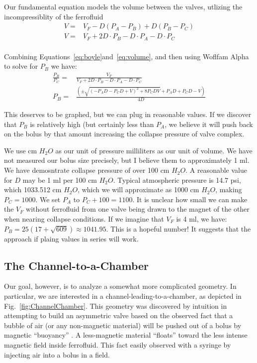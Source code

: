 \documentclass{asme2ej}
\begin{document}
Our fundamental equation models the volume between the
valves, utlizing the incompressiblity of the ferrofluid
\begin{align}
  V = & V_F - D(P_A - P_B) + D(P_B - P_C) \\
  V = & V_F + 2D\cdot P_B - D\cdot P_A - D\cdot P_C \\
    \label{eq:volume}
\end{align}

Combining Equations~\ref{eq:boyle}and~\ref{eq:volume}, and then
using Woflfam Alpha to solve for $P_B$ we have:
\begin{align}
  \frac{P_B}{P_C} = & \frac{V_F}{V_F + 2D\cdot P_B - D\cdot P_A - D\cdot P_C} \\
  P_B = & \frac{ (\pm \sqrt{(-P_A D - P_C D + V)^2 + 8 P_C D V} + P_A D + P_C D - V)}{4 D}
\end{align}

This deserves to be graphed, but we can plug in reasonable values.
If we discover that $P_B$ is relatively high (but certainly less than
$P_A$, we believe it will push back on the bolus by that amount increasing
the collapse pressure of valve complex.

We use cm $H_2O$ as our unit of pressure milliliters as our unit of volume.
We have not measured our bolus size precisely, but I believe them to approximately 1 ml. We have demosntrate collapse pressure of over 100 cm $H_2O$.
A reasonable value for $D$ may be 1 ml per 100 cm $H_2O$.
Typical atmospheric pressure is 14.7 psi, which 1033.512 cm $H_2O$, which
we will approximate as 1000 cm $H_2O$, making $P_C = 1000$.
We set $P_A$ to $P_C + 100 = 1100$.
It is unclear how small we can make the $V_F$ without ferrofluid
from one valve being drawn to the magnet of the other when nearing collapse
conditions. If we imagine that $V_F$ is 4 ml, we have:
$P_B  =  25 (17 + \sqrt{609})\approx 1041.95$. This is a hopeful number!
It suggests that the approach if plaing values in series will work.



\subsection{The Channel-to-a-Chamber}

Our goal, however, is to analyze a somewhat more complicated geometry.
In particular, we are interested in a channel-leading-to-a-chamber,
as depicted in Fig.~\ref{fig:ChannelChamber}.
This geometry was discovered by intuition in attempting to build an asymmetric valve
based on the observed fact that a bubble of air (or any non-magnetic material) will
be pushed out of a bolus by magnetic ``buoyancy'' \cite{wakayama1997magnetic,cheng2014three}.
A less-magnetic material ``floats'' toward the less intense magnetic field inside
ferrofluid. This fact easily observed with a syringe by injecting air into a bolus
in a field.
\end{document}
